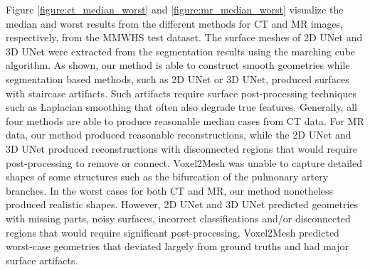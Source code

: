 \documentclass[times,review,preprint,authoryear]{elsarticle}
\begin{document}
Figure \ref{figure:ct_median_worst} and \ref{figure:mr_median_worst} visualize the median and worst results from the different methods for CT and MR images, respectively, from the MMWHS test dataset. The surface meshes of 2D UNet and 3D UNet were extracted from the segmentation results using the marching cube algorithm. As shown, our method is able to construct smooth geometries while segmentation based methods, such as 2D UNet or 3D UNet, produced surfaces with staircase artifacts. Such artifacts require surface post-processing techniques such as Laplacian smoothing that often also degrade true features. Generally, all four methods are able to produce reasonable median cases from CT data. For MR data, our method produced reasonable reconstructions, while the 2D UNet and 3D UNet produced reconstructions with disconnected regions that would require post-processing to remove or connect. Voxel2Mesh was unable to capture detailed shapes of some structures such as the bifurcation of the pulmonary artery branches. In the worst cases for both CT and MR, our method nonetheless produced realistic shapes. However, 2D UNet and 3D UNet predicted geometries with missing parts, noisy surfaces, incorrect classifications and/or disconnected regions that would require significant post-processing. Voxel2Mesh predicted worst-case geometries that deviated largely from ground truths and had major surface artifacts.  
\end{document}
